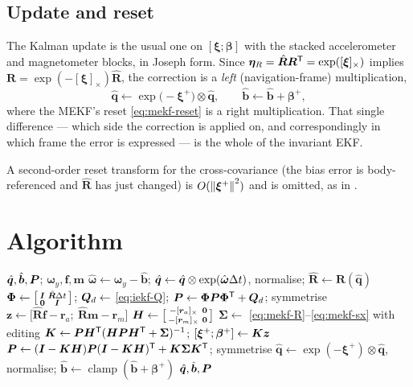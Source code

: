 \subsection{Update and reset}
The Kalman update is the usual one on $[\bm{\xi};\bm{\beta}]$ with the stacked accelerometer and
magnetometer blocks, in Joseph form. Since $\bm{\eta}_R=\hat{\bm{R}}\bm{R}^{\mathsf{T}}=\exp([\bm{\xi}]_\times)$
implies $\bm{R}=\exp(-[\bm{\xi}]_\times)\hat{\bm{R}}$, the correction is a \emph{left}
(navigation-frame) multiplication,
\begin{equation}
\hat{\bm{q}}\leftarrow \exp\!\big(-\bm{\xi}^+\big)\otimes\hat{\bm{q}},
\qquad
\hat{\bm{b}}\leftarrow \hat{\bm{b}}+\bm{\beta}^+ ,
\label{eq:iekf-reset}
\end{equation}
where the MEKF's reset \eqref{eq:mekf-reset} is a right multiplication. That single difference ---
which side the correction is applied on, and correspondingly in which frame the error is
expressed --- is the whole of the invariant EKF.

A second-order reset transform for the cross-covariance (the bias error is body-referenced and
$\hat{\bm{R}}$ has just changed) is $O(\left\lVert \bm{\xi}^+ \right\rVert^2)$ and is omitted, as in
\cite{barrau2018review}.

\section{Algorithm}
\begin{algorithm}[H]
\caption{Right-invariant EKF --- one sampling period}
\begin{algorithmic}[1]
\Require $\hat{\bm{q}},\hat{\bm{b}},\bm{P}$; $\bm{\omega}_y,\bm{f},\bm{m}$
\State $\hat{\bm{\omega}}\gets\bm{\omega}_y-\hat{\bm{b}}$;\;
       $\hat{\bm{q}}\gets\hat{\bm{q}}\otimes\exp(\hat{\bm{\omega}}\Delta t)$, normalise;\;
       $\hat{\bm{R}}\gets\bm{R}(\hat{\bm{q}})$
\State $\bm{\Phi}\gets\big[\begin{smallmatrix}\bm{I}&\hat{\bm{R}}\Delta t\\ \bm{0}&\bm{I}\end{smallmatrix}\big]$;\;
       $\bm{Q}_d\gets$ \eqref{eq:iekf-Q};\; $\bm{P}\gets\bm{\Phi}\bm{P}\bm{\Phi}^{\mathsf{T}}+\bm{Q}_d$; symmetrise
\State $\bm{z}\gets\big[\hat{\bm{R}}\bm{f}-\bm{r}_a;\ \hat{\bm{R}}\bm{m}-\bm{r}_m\big]$
\State $\bm{H}\gets\big[\begin{smallmatrix}-[\bm{r}_a]_\times&\bm{0}\\ -[\bm{r}_m]_\times&\bm{0}\end{smallmatrix}\big]$
\State $\bm{\Sigma}\gets$ \eqref{eq:mekf-R}--\eqref{eq:mekf-sx} with editing
\State $\bm{K}\gets\bm{P}\bm{H}^{\mathsf{T}}(\bm{H}\bm{P}\bm{H}^{\mathsf{T}}+\bm{\Sigma})^{-1}$;\;
       $[\bm{\xi}^+;\bm{\beta}^+]\gets\bm{K}\bm{z}$
\State $\bm{P}\gets(\bm{I}-\bm{K}\bm{H})\bm{P}(\bm{I}-\bm{K}\bm{H})^{\mathsf{T}}+\bm{K}\bm{\Sigma}\bm{K}^{\mathsf{T}}$; symmetrise
\State $\hat{\bm{q}}\gets\exp(-\bm{\xi}^+)\otimes\hat{\bm{q}}$, normalise;\;
       $\hat{\bm{b}}\gets\operatorname{clamp}(\hat{\bm{b}}+\bm{\beta}^+)$
\Ensure $\hat{\bm{q}},\hat{\bm{b}},\bm{P}$
\end{algorithmic}
\end{algorithm}

